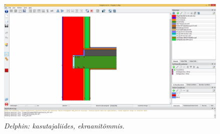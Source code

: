 \begin{figure}[ht]
    \centering
    \includegraphics[width=1\textwidth]{figures/problem_statement/08_delphin_sample.png}
    \caption[Delphin tarkvara kasutajaliides, ekraanitõmmis]{\textit{Delphin: kasutajaliides, ekraanitõmmis.}}
    \label{fig:delfin_sample}
\end{figure}

